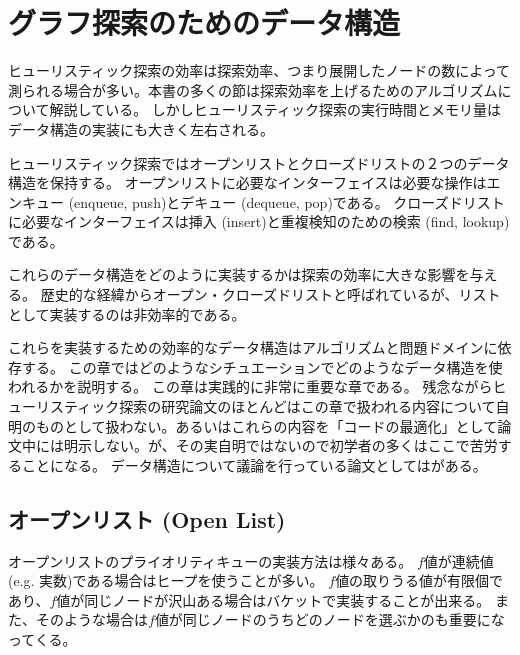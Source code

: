 \chapter{グラフ探索のためのデータ構造}
\label{ch:search-performance}

ヒューリスティック探索の効率は探索効率、つまり展開したノードの数によって測られる場合が多い。本書の多くの節は探索効率を上げるためのアルゴリズムについて解説している。
しかしヒューリスティック探索の実行時間とメモリ量はデータ構造の実装にも大きく左右される。

ヒューリスティック探索ではオープンリストとクローズドリストの２つのデータ構造を保持する。
オープンリストに必要なインターフェイスは必要な操作はエンキュー (enqueue, push)とデキュー (dequeue, pop)である。
クローズドリストに必要なインターフェイスは挿入 (insert)と重複検知のための検索 (find, lookup)である。

これらのデータ構造をどのように実装するかは探索の効率に大きな影響を与える。
歴史的な経緯からオープン・クローズドリストと呼ばれているが、リストとして実装するのは非効率的である。

これらを実装するための効率的なデータ構造はアルゴリズムと問題ドメインに依存する。
この章ではどのようなシチュエーションでどのようなデータ構造を使われるかを説明する。
この章は実践的に非常に重要な章である。
残念ながらヒューリスティック探索の研究論文のほとんどはこの章で扱われる内容について自明のものとして扱わない。あるいはこれらの内容を「コードの最適化」として論文中には明示しない。が、その実自明ではないので初学者の多くはここで苦労することになる。
データ構造について議論を行っている論文としては\cite{burns2012implementing}がある。




\section{オープンリスト (Open List)}
\label{sec:open-list}
オープンリストのプライオリティキューの実装方法は様々ある。
$f$値が連続値 (e.g. 実数)である場合はヒープを使うことが多い。
$f$値の取りうる値が有限個であり、$f$値が同じノードが沢山ある場合はバケットで実装することが出来る。
また、そのような場合は$f$値が同じノードのうちどのノードを選ぶかのも重要になってくる。


